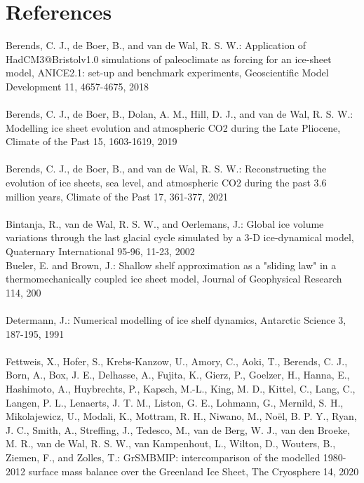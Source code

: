 \documentclass{article}
\begin{document}
\newpage
\section{References}

Berends, C. J., de Boer, B., and van de Wal, R. S. W.: Application of HadCM3@Bristolv1.0 simulations of paleoclimate as forcing for an ice-sheet model, ANICE2.1: set-up and benchmark experiments, Geoscientific Model Development 11, 4657-4675, 2018\\
\\
Berends, C. J., de Boer, B., Dolan, A. M., Hill, D. J., and van de Wal, R. S. W.: Modelling ice sheet evolution and atmospheric CO2 during the Late Pliocene, Climate of the Past 15, 1603-1619, 2019\\
\\
Berends, C. J., de Boer, B., and van de Wal, R. S. W.: Reconstructing the evolution of ice sheets, sea level, and atmospheric CO2 during the past 3.6 million years, Climate of the Past 17, 361-377, 2021\\
\\
Bintanja, R., van de Wal, R. S. W., and Oerlemans, J.: Global ice volume variations through the last glacial cycle simulated by a 3-D ice-dynamical model, Quaternary International 95-96, 11-23, 2002\
\\
Bueler, E. and Brown, J.: Shallow shelf approximation as a "sliding law" in a thermomechanically coupled ice sheet model, Journal of Geophysical Research 114, 200\\
\\
Determann, J.: Numerical modelling of ice shelf dynamics, Antarctic Science 3, 187-195, 1991\\
\\
Fettweis, X., Hofer, S., Krebs-Kanzow, U., Amory, C., Aoki, T., Berends, C. J., Born, A., Box, J. E., Delhasse, A., Fujita, K., Gierz, P., Goelzer, H., Hanna, E., Hashimoto, A., Huybrechts, P., Kapsch, M.-L., King, M. D., Kittel, C., Lang, C., Langen, P. L., Lenaerts, J. T. M., Liston, G. E., Lohmann, G., Mernild, S. H., Mikolajewicz, U., Modali, K., Mottram, R. H., Niwano, M., Noël, B. P. Y., Ryan, J. C., Smith, A., Streffing, J., Tedesco, M., van de Berg, W. J., van den Broeke, M. R., van de Wal, R. S. W., van Kampenhout, L., Wilton, D., Wouters, B., Ziemen, F., and Zolles, T.: GrSMBMIP: intercomparison of the modelled 1980-2012 surface mass balance over the Greenland Ice Sheet, The Cryosphere 14, 2020\\
\\
\end{document}
